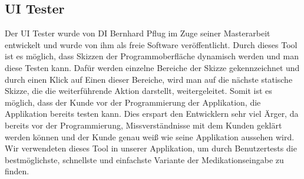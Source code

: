 
\subsection{UI Tester}

Der UI Tester wurde von DI Bernhard Pflug im Zuge seiner Masterarbeit entwickelt und wurde von ihm als freie Software veröffentlicht. Durch dieses Tool ist es möglich, dass Skizzen der Programmoberfläche dynamisch werden und man diese Testen kann. Dafür werden einzelne Bereiche der Skizze gekennzeichnet und durch einen Klick auf Einen dieser Bereiche, wird man auf die nächste statische Skizze, die die weiterführende Aktion darstellt, weitergeleitet. 
Somit ist es möglich, dass der Kunde vor der Programmierung der Applikation, die Applikation bereits testen kann. Dies erspart den Entwicklern sehr viel Ärger, da bereits vor der Programmierung, Missverständnisse mit dem Kunden geklärt werden können und der Kunde genau weiß wie seine Applikation aussehen wird.
Wir verwendeten dieses Tool in unserer Applikation, um durch Benutzertests die bestmöglichste, schnellste und einfachste Variante der Medikationseingabe zu finden.